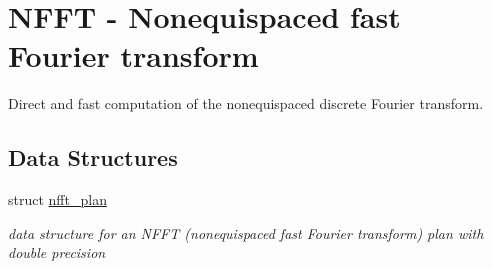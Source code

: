 \hypertarget{group__nfft}{\section{N\-F\-F\-T -\/ Nonequispaced fast Fourier transform}
\label{group__nfft}
}


Direct and fast computation of the nonequispaced discrete Fourier transform.  


\subsection*{Data Structures}
\begin{DoxyCompactItemize}
\item 
struct \hyperlink{structnfft__plan}{nfft\-\_\-plan}
\begin{DoxyCompactList}\small\item\em data structure for an N\-F\-F\-T (nonequispaced fast Fourier transform) plan with double precision \end{DoxyCompactList}\end{DoxyCompactItemize}
